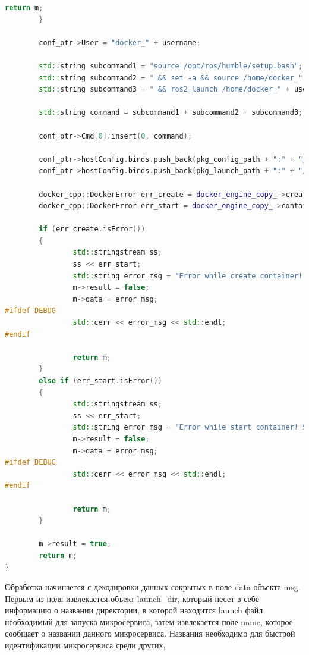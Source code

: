 \documentclass[a4paper, 14pt]{extreport}
\begin{document}
\begin{lstlisting}[language=C++, frame=single, xleftmargin=15pt, caption={Определение методов класса RoboContainerExec},label=DescriptiveLabel]
                return m;
        }

        conf_ptr->User = "docker_" + username;

        std::string subcommand1 = "source /opt/ros/humble/setup.bash";
        std::string subcommand2 = " && set -a && source /home/docker_" + username + "/launch/up.env && set +a";
        std::string subcommand3 = " && ros2 launch /home/docker_" + username + "/launch/";

        std::string command = subcommand1 + subcommand2 + subcommand3;

        conf_ptr->Cmd[0].insert(0, command);
        
        conf_ptr->hostConfig.binds.push_back(pkg_config_path + ":" + "/home/docker_" + username + "/config");
        conf_ptr->hostConfig.binds.push_back(pkg_launch_path + ":" + "/home/docker_" + username + "/launch");

        docker_cpp::DockerError err_create = docker_engine_copy_->createContainer(*conf_ptr, name);
        docker_cpp::DockerError err_start = docker_engine_copy_->containerStart(name);
        
        if (err_create.isError())
        {
                std::stringstream ss;
                ss << err_start;
                std::string error_msg = "Error while create container! Server response: " + ss.str();
                m->result = false;
                m->data = error_msg;
#ifdef DEBUG
                std::cerr << error_msg << std::endl;
#endif

                return m;
        }
        else if (err_start.isError())
        {
                std::stringstream ss;
                ss << err_start;
                std::string error_msg = "Error while start container! Server response: " + ss.str();
                m->result = false;
                m->data = error_msg;
#ifdef DEBUG
                std::cerr << error_msg << std::endl;
#endif

                return m;
        }

        m->result = true;
        return m;
}
\end{lstlisting}
\par Обработка начинается с декодировки данных сокрытых в поле data объекта msg. Первым из поля извлекается объект launch\_dir, который 
несет в себе информацию о названии директории, в которой находится launch файл необходимый для запуска микросервиса, затем извлекается 
поле name, которое сообщает о названии данного микросервиса. Названия необходимо для быстрой идентификации микросервиса среди других,
\end{document}
